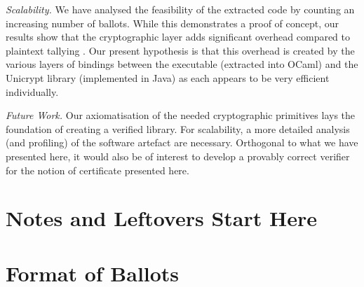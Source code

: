 \documentclass{llncs}
\begin{document}
\smallskip\noindent\emph{Scalability.} We have analysed the
feasibility of the extracted code by counting an increasing number
of ballots. While this demonstrates a proof of concept, our results
show that the cryptographic layer adds significant overhead compared
to plaintext tallying \cite{Pattinson:2017:SVE}.  Our present
hypothesis is that this overhead is created by the various layers of
bindings between the executable (extracted into OCaml) and the
Unicrypt library (implemented in Java) as each appears to be very
efficient individually. 

\smallskip\noindent\emph{Future Work.} Our axiomatisation of the
needed cryptographic primitives lays the foundation of creating a
verified library. For scalability, a more detailed analysis (and
profiling) of the software artefact are necessary. Orthogonal to
what we have presented here, it would also be of interest to develop
a provably correct verifier for the notion of certificate presented
here. 




\appendix
\section*{Notes and Leftovers Start Here}



\section{Format of Ballots}
\end{document}
